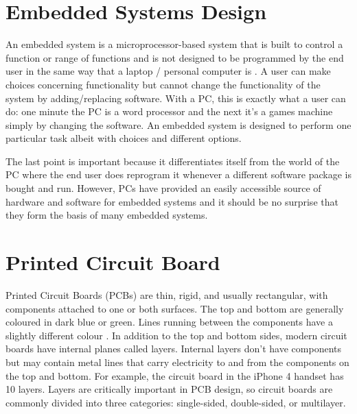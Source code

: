 \section{Embedded Systems Design} 


An embedded system is a microprocessor-based system
that is built to control a function or range of functions and is not designed to be
programmed by the end user in the same way that a laptop / personal computer is \cite{embedded}. A user can make choices
concerning functionality but cannot change the functionality of the system by
adding/replacing software. With a PC, this is exactly what a user can do: one minute
the PC is a word processor and the next it's a games machine simply by changing the
software. An embedded system is designed to perform one particular task albeit with
choices and different options.

The last point is important because it differentiates itself from the world of the PC
where the end user does reprogram it whenever a different software package is bought
and run. However, PCs have provided an easily accessible source of hardware and
software for embedded systems and it should be no surprise that they form the basis
of many embedded systems.

\section{Printed Circuit Board} 

Printed Circuit Boards (PCBs) are thin, rigid, and usually rectangular, with
components attached to one or both surfaces. The top and bottom are generally
coloured in dark blue or green. Lines running between the components have a slightly
different colour \cite{eagle}. In addition to the top and bottom sides, modern circuit boards have
internal planes called layers. Internal layers don’t have components but may contain
metal lines that carry electricity to and from the components on the top and bottom.
For example, the circuit board in the iPhone 4 handset has 10 layers. Layers are
critically important in PCB design, so circuit boards are commonly divided into three
categories: single-sided, double-sided, or multilayer. 

%
%
%
%
%
%

